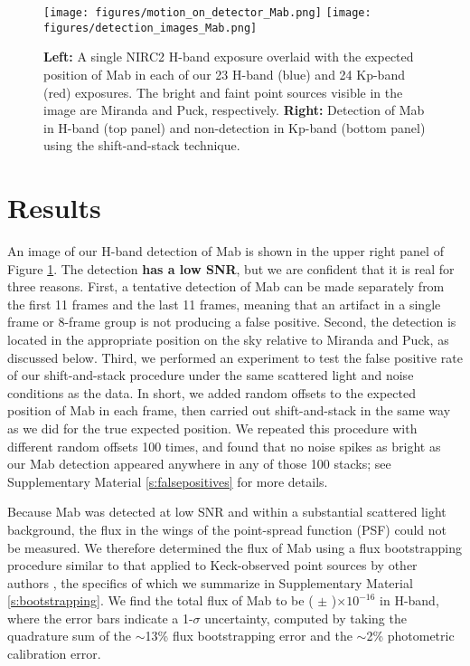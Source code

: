 \documentclass[preprint]{aastex631}
\begin{document}
\begin{figure}
\texttt{[image: figures/motion\_on\_detector\_Mab.png]}
\texttt{[image: figures/detection\_images\_Mab.png]}
\caption{\textbf{Left:} A single NIRC2 H-band exposure overlaid with the expected position of Mab in each of our 23 H-band (blue) and 24 Kp-band (red) exposures. The bright and faint point sources visible in the image are Miranda and Puck, respectively. \textbf{Right:} Detection of Mab in H-band (top panel) and non-detection in Kp-band (bottom panel) using the shift-and-stack technique.\label{fig:detection}}
\end{figure}



\section{Results}
\label{s:results}

An image of our H-band detection of Mab is shown in the upper right panel of Figure \ref{fig:detection}. The detection \textbf{has a low SNR}, but we are confident that it is real for three reasons. First, a tentative detection of Mab can be made separately from the first 11 frames and the last 11 frames, meaning that an artifact in a single frame or 8-frame group is not producing a false positive. Second, the detection is located in the appropriate position on the sky relative to Miranda and Puck, as discussed below. Third, we performed an experiment to test the false positive rate of our shift-and-stack procedure under the same scattered light and noise conditions as the data. In short, we added random offsets to the expected position of Mab in each frame, then carried out shift-and-stack in the same way as we did for the true expected position. We repeated this procedure with different random offsets 100 times, and found that no noise spikes as bright as our Mab detection appeared anywhere in any of those 100 stacks; see Supplementary Material \ref{s:falsepositives} for more details.

Because Mab was detected at low SNR and within a substantial scattered light background, the flux in the wings of the point-spread function (PSF) could not be measured. We therefore determined the flux of Mab using a flux bootstrapping procedure similar to that applied to Keck-observed point sources by other authors \citep[][]{gibbard05, depater14b, molter19, paradis23}, the specifics of which we summarize in Supplementary Material \ref{s:bootstrapping}. We find the total flux of Mab to be
( $\pm$ )$\times10^{-16}$ \ergsec{} 
in H-band, where the error bars indicate a 1-$\sigma$ uncertainty, computed by taking the quadrature sum of the $\sim$13\% flux bootstrapping error and the $\sim$2\% photometric calibration error. 
\end{document}
